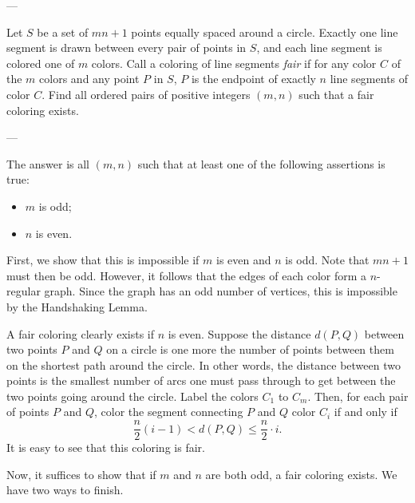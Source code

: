 
---

Let $S$ be a set of $mn+1$ points equally spaced around a circle. Exactly one line segment is drawn between every pair of points in $S$, and each line segment is colored one of $m$ colors. Call a coloring of line segments \emph{fair} if for any color $C$ of the $m$ colors and any point $P$ in $S$, $P$ is the endpoint of exactly $n$ line segments of color $C.$ Find all ordered pairs of positive integers $(m,n)$ such that a fair coloring exists. 

---

The answer is all $(m,n)$ such that at least one of the following assertions is true:
\begin{itemize}[itemsep=0em]
    \item $m$ is odd;
    \item $n$ is even.
\end{itemize}

First, we show that this is impossible if $m$ is even and $n$ is odd. Note that $mn+1$ must then be odd. However, it follows that the edges of each color form a $n$-regular graph. Since the graph has an odd number of vertices, this is impossible by the Handshaking Lemma.

A fair coloring clearly exists if $n$ is even. Suppose the distance $d(P,Q)$ between two points $P$ and $Q$ on a circle is one more the number of points between them on the shortest path around the circle. In other words, the distance between two points is the smallest number of arcs one must pass through to get between the two points going around the circle. Label the colors $C_1$ to $C_m$. Then, for each pair of points $P$ and $Q$, color the segment connecting $P$ and $Q$ color $C_i$ if and only if \[\frac{n}{2}(i-1)<d(P,Q)\le\frac{n}{2}\cdot i.\]
It is easy to see that this coloring is fair.

Now, it suffices to show that if $m$ and $n$ are both odd, a fair coloring exists. We have two ways to finish.

